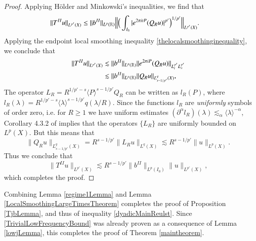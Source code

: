 \begin{proof}
    Applying H\"{o}lder and Minkowski's inequalities, we find that
    \begin{equation}
    \begin{split}
        \| T^{II}u \|_{L^{p'}(X)} &\leq \| b^{II} \|_{L^p(\operatorname{\mathbb{R}})} \Big\| \Big( \int_{I_0} |e^{2 \pi i t P} (Q_R u)|^{p'} \Big)^{1/p'} \Big\|_{L^{p'}(X)}.
    \end{split}
    \end{equation}
    Applying the endpoint local smoothing inequality \eqref{thelocalsmoothinginequality}, we conclude that
    \begin{equation}
    \begin{split}
        \| T^{II} u \|_{L^{p'}(X)} &\lesssim \| b^{II} \|_{L^p(\operatorname{\mathbb{R}})}  \| e^{2 \pi i P} (Q_R u) \|_{L^{p'}_t L^{p'}_x}\\
        &\lesssim  \| b^{II} \|_{L^p(\operatorname{\mathbb{R}})}  \| Q_R u \|_{L^q_{s - 1/p'}(X)},
    \end{split}
    \end{equation}
    The operator $L_R = R^{1/p' - s} \langle P \rangle^{s - 1/p'} Q_R$ can be written as $l_R(P)$, where $l_R(\lambda) = R^{1/p' - s} \langle \lambda \rangle^{s - 1/p'} q(\lambda/R)$. Since the functions $l_R$ are \emph{uniformly} symbols of order zero, i.e. for $R \geq 1$ we have uniform estimates $(\partial^\alpha l_R)(\lambda) \lesssim_\alpha \langle \lambda \rangle^{- \alpha}$, Corollary 4.3.2 of \cite{Sogge} implies that the operators $\{ L_R \}$ are uniformly bounded on $L^p(X)$. But this means that
    \begin{equation}
        \| Q_R u \|_{L^{q}_{s - 1/p'}(X)} = R^{s - 1/p'} \| L_R u \|_{L^q(X)} \lesssim R^{s - 1/p'} \| u \|_{L^p(X)}.
    \end{equation}
    Thus we conclude that
    \begin{equation}
        \| T^{II}u \|_{L^{p'}(X)} \lesssim R^{s - 1/p'} \| b^{II} \|_{L^p(I_0)} \| u \|_{L^{p'}(X)},
    \end{equation}
    which completes the proof.
\end{proof}

Combining Lemma \ref{regime1Lemma} and Lemma \ref{LocalSmoothingLargeTimesTheorem} completes the proof of Proposition \ref{TjbLemma}, and thus of inequality \eqref{dyadicMainReulst}. Since \eqref{TrivialLowFrequencyBound} was already proven as a consequence of Lemma \ref{lowjLemma}, this completes the proof of Theorem \ref{maintheorem}.






